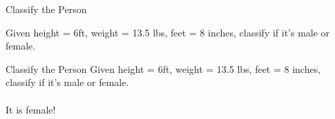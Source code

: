 \documentclass{beamer}
\begin{document}
\begin{frame}{Classify the Person}

    Given height = 6ft, weight = 13.5 lbs, feet = 8 inches, classify if it's male or female.
    
\end{frame}

\begin{frame}{Classify the Person}
    Given height = 6ft, weight = 13.5 lbs, feet = 8 inches, classify if it's male or female.\\
    \\
    It is female!
\end{frame}









\end{document}
